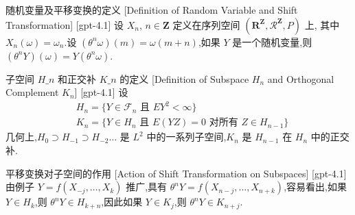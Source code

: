 \documentclass[UTF8]{ctexart}
\begin{document}
    
    
    \begin{dfn}
        {随机变量及平移变换的定义}
        [Definition of Random Variable and Shift Transformation]
        [gpt-4.1]
        设 $X_{n}$, $n \in \mathbf{Z}$ 定义在序列空间 $( \mathbf{R}^{\mathbf{Z}}, \mathcal{R}^{\mathbf{Z}}, P )$ 上, 其中 $X_{n} ( \omega ) = \omega_{n}$.设 $( \theta^{n} \omega )(m) = \omega ( m + n )$,如果 $Y$ 是一个随机变量,则 $( \theta^{n} Y ) ( \omega ) = Y ( \theta^{n} \omega )$.
    \end{dfn}
    
    
    
    \begin{dfn}
        {子空间 $H\_n$ 和正交补 $K\_n$ 的定义}
        [Definition of Subspace $H_n$ and Orthogonal Complement $K_n$]
        [gpt-4.1]
        设
\[
\begin{array}{rl}
& H_{n} = \{ Y \in \mathcal{F}_{n} \text{ 且 } E Y^{2} < \infty \} \\
& K_{n} = \{ Y \in H_{n} \text{ 且 } E ( YZ ) = 0 \text{ 对所有 } Z \in H_{n-1} \}
\end{array}
\]
几何上,$H_{0} \supset H_{-1} \supset H_{-2} \ldots$ 是 $L^{2}$ 中的一系列子空间,$K_{n}$ 是 $H_{n-1}$ 在 $H_{n}$ 中的正交补.
    \end{dfn}
    
    
    
    \begin{ppt}
        {平移变换对子空间的作用}
        [Action of Shift Transformation on Subspaces]
        [gpt-4.1]
        由例子 $Y = f ( X_{-j}, \ldots, X_{k} )$ 推广,具有 $\theta^{n} Y = f ( X_{n-j}, \ldots, X_{n+k} )$,容易看出,如果 $Y \in H_{k}$,则 $\theta^{n} Y \in H_{k+n}$,因此如果 $Y \in K_{j}$,则 $\theta^{n} Y \in K_{n+j}$.
    \end{ppt}
    
    
    
\end{document}
